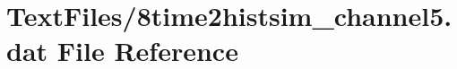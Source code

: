 \hypertarget{8time2histsim__channel5_8dat}{}\section{Text\+Files/8time2histsim\+\_\+channel5.dat File Reference}
\label{8time2histsim__channel5_8dat}
